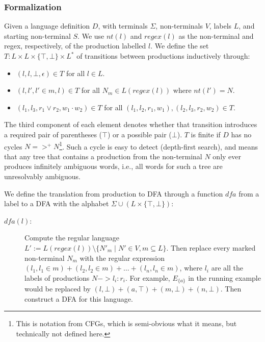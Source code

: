 \documentclass[acmsmall,review,anonymous]{acmart}\settopmatter{printfolios=true,printccs=false,printacmref=false}
\newcommand{\NT}{V} %
\newcommand{\T}{\Sigma} %
\newcommand{\Labels}{L} %
\newcommand{\dfa}{\mathit{dfa}} %
\newcommand{\labelnt}{\mathit{nt}} %
\newcommand{\labelregex}{\mathit{regex}} %
\begin{document}

\subsubsection{Formalization}

Given a language definition $D$, with terminals $\T$, non-terminals $\NT$, labels $\Labels$, and starting non-terminal $S$. We use $\labelnt(l)$ and $\labelregex(l)$ as the non-terminal and regex, respectively, of the production labelled $l$. We define the set $T : \Labels \times \Labels \times \{\top, \bot\} \times \Labels^{*}$ of transitions between productions inductively through:

\begin{itemize}
\item $(l, l, \bot, \epsilon) \in T$ for all $l \in \Labels$.
\item $(l, l', l' \in m, l) \in T$ for all $N_m \in L(\labelregex(l))$ where $\labelnt(l') = N$.
\item $(l_1, l_3, r_1 \lor r_2, w_1 \cdot w_2) \in T$ for all $(l_1, l_2, r_1, w_1), (l_2, l_3, r_2, w_2) \in T$.
\end{itemize}

\noindent The third component of each element denotes whether that transition introduces a required pair of parentheses ($\top$) or a possible pair ($\bot$). $T$ is finite if $D$ has no cycles $N =>^{+} N$\footnote{This is notation from CFGs, which is semi-obvious what it means, but technically not defined here.}. Such a cycle is easy to detect (depth-first search), and means that any tree that contains a production from the non-terminal $N$ only ever produces infinitely ambiguous words, i.e., all words for such a tree are unresolvably ambiguous.

We define the translation from production to DFA through a function $\dfa$ from a label to a DFA with the alphabet $\T \cup (\Labels \times \{\top, \bot\})$:

\begin{description}
\item[$\dfa(l)$:] Compute the regular language $L' := L(\labelregex(l)) \setminus \{N'_m \mid N' \in \NT, m \subseteq \Labels\}$. Then replace every marked non-terminal $N_m$ with the regular expression $(l_1, l_1 \in m) + (l_2, l_2 \in m) + \ldots + (l_n, l_n \in m)$, where $l_i$ are all the labels of productions $N -> l_i : r_i$. For example, $E_{\{a\}}$ in the running example would be replaced by $(l, \bot) + (a, \top) + (m, \bot) + (n, \bot)$. Then construct a DFA for this language.
\end{description}
\end{document}
